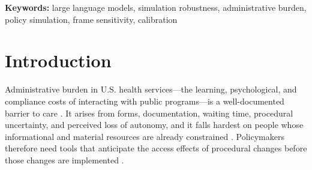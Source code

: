 \documentclass[12pt,a4paper]{article}
\begin{document}
\begin{abstract}
\vspace{0.5em}
\noindent\rule{\linewidth}{0.4pt}
\vspace{0.3em}

\noindent\textbf{What is known on this topic}
\begin{itemize}[leftmargin=*,noitemsep,topsep=0pt]
\item LLMs are increasingly used to simulate social judgments and policy effects in health services research.
\item Model values are usually measured with survey prompts rather than downstream simulated policy effects, so whether those orientations shape simulated effects is unknown.
\end{itemize}

\vspace{0.3em}
\noindent\textbf{What this study found}
\begin{itemize}[leftmargin=*,noitemsep,topsep=0pt]
\item A composite derived from an MFQ-30--derived probe does not significantly predict cross-model variation in simulated burden effects: higher individualizing-composite models show no consistent pattern in burden effects.
\item Naturally expressed rationale frames show no detectable within-pair association with simulated effects under the primary specification.
\item Assigned frames shift simulated effects within models: collective obligation reduces them in all four tested models; autonomy and equity increase them in three.
\end{itemize}

\end{abstract}

\noindent\textbf{Keywords:} large language models, simulation robustness, administrative burden, policy simulation, frame sensitivity, calibration


\clearpage

\section{Introduction}

Administrative burden in U.S. health services---the learning, psychological, and compliance costs of interacting with public programs---is a well-documented barrier to care \citep{herd2018administrative,moynihan2015administrative}. It arises from forms, documentation, waiting time, procedural uncertainty, and perceived loss of autonomy, and it falls hardest on people whose informational and material resources are already constrained \citep{herd2018administrative,baekgaard2021burden,Kyle2021,Shin2025}. Policymakers therefore need tools that anticipate the access effects of procedural changes before those changes are implemented \citep{Shafer2025,halling2023administrative}.
\end{document}

